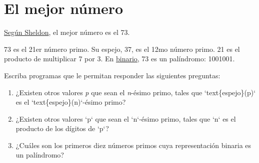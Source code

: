 \section{El mejor número}

\href{http://www.youtube.com/watch?v=Gg9kSn3NRVk}{Según Sheldon}, el
mejor número es el 73.

73 es el 21er número primo. Su espejo, 37, es el 12mo número primo. 21
es el producto de multiplicar 7 por 3. En
\href{http://es.wikipedia.org/wiki/Sistema\_binario}{binario}, 73 es un
palíndromo: 1001001.

Escriba programas que le permitan responder las siguientes preguntas:

\begin{enumerate}
\item
  ¿Existen otros valores \emph{p} que sean el \emph{n}-ésimo primo,
  tales que `text\{espejo\}(p)` es el `text\{espejo\}(n)`-ésimo primo?
\item
  ¿Existen otros valores `p` que sean el `n`-ésimo primo, tales que `n`
  es el producto de los dígitos de `p`?
\item
  ¿Cuáles son los primeros diez números primos cuya representación
  binaria es un palíndromo?
\end{enumerate}
